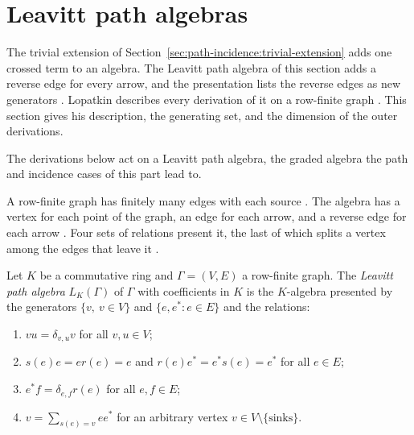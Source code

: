 \section{Leavitt path algebras}\label{sec:path-incidence:leavitt}

The trivial extension of Section~\ref{sec:path-incidence:trivial-extension} adds one
crossed term to an algebra. The Leavitt path algebra of this section adds a reverse
edge for every arrow, and the presentation lists the reverse edges as new generators
\cite[p.~61]{Lopatkin2019}. Lopatkin describes every derivation of it on a row-finite
graph \cite[p.~59]{Lopatkin2019}. This section gives his description, the generating
set, and the dimension of the outer derivations.

The derivations below act on a Leavitt path algebra, the graded algebra the path and incidence cases of this part lead to.

A row-finite graph has finitely many edges with each source
\cite[p.~60]{Lopatkin2019}. The algebra has a vertex for each point of the graph, an
edge for each arrow, and a reverse edge for each arrow \cite[p.~61]{Lopatkin2019}.
Four sets of relations present it, the last of which splits a vertex among the edges
that leave it \cite[p.~61]{Lopatkin2019}.

\begin{definition}\label{def:leavitt:algebra}
Let $K$ be a commutative ring and $\Gamma=(V,E)$ a row-finite graph. The
\emph{Leavitt path algebra} $L_{K}(\Gamma)$ of $\Gamma$ with coefficients in $K$ is
the $K$-algebra presented by the generators $\{v,\ v\in V\}$ and
$\{e,e^{*}\colon e\in E\}$ and the relations:
\begin{enumerate}[label=(\arabic*)]
\item $vu=\delta_{v,u}v$ for all $v,u\in V$;
\item $s(e)e=er(e)=e$ and $r(e)e^{*}=e^{*}s(e)=e^{*}$ for all $e\in E$;
\item $e^{*}f=\delta_{e,f}r(e)$ for all $e,f\in E$;
\item $v=\sum_{s(e)=v}ee^{*}$ for an arbitrary vertex $v\in V\setminus\{\text{sinks}\}$.
\end{enumerate}
\end{definition}

